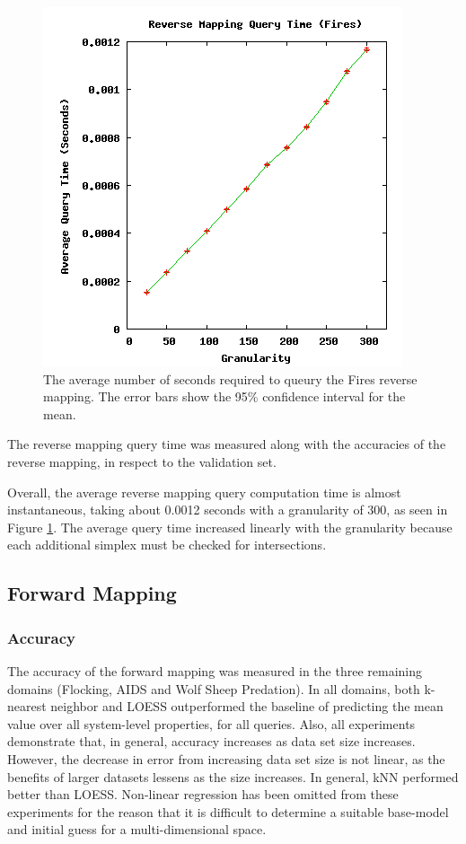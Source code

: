 \begin{figure}[ht]
\centering
\includegraphics[scale=.5]{images/results_fires/rmquery.png}
\caption{The average number of seconds required to queury the Fires reverse mapping.
The error bars show the 95\% confidence interval for the mean.}
\label{fig:rmquery}
\end{figure}

The reverse mapping query time was measured along with the accuracies of the reverse mapping, in respect to the validation set.

Overall, the average reverse mapping query computation time is almost instantaneous, taking about 0.0012 seconds with a granularity of 300, as seen in Figure \ref{fig:rmquery}.
The average query time increased linearly with the granularity because each additional simplex must be checked for intersections.


 \subsection{Forward Mapping}

  \subsubsection{Accuracy}

The accuracy of the forward mapping was measured in the three remaining domains (Flocking, AIDS and Wolf Sheep Predation).
In all domains, both k-nearest neighbor and LOESS outperformed the baseline of predicting the mean value over all system-level properties, for all queries.
Also, all experiments demonstrate that, in general, accuracy increases as data set size increases.
However, the decrease in error from increasing data set size is not linear, as the benefits of larger datasets lessens as the size increases.
In general, kNN performed better than LOESS.
Non-linear regression has been omitted from these experiments for the reason that it is difficult to determine a suitable base-model and initial guess for a multi-dimensional space.

